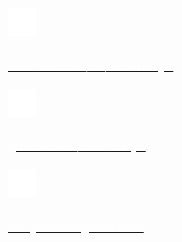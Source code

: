 \documentclass[../main.tex]{subfiles}
\begin{document}
    \hspace*{1cm}
    \begin{minipage}[t]{1cm}
        \vspace*{0.2cm}\includegraphics[width=0.75cm]{assets/linkedin.png}
    \end{minipage}
    \begin{minipage}[t]{5.5cm}
        \vspace*{0.4cm}\textcolor{white}{\underline{\href{https://www.linkedin.com/in/albatalaya}{\textcolor{white}{linkedin.com/in/albatalaya}}}}
    \end{minipage}
    \begin{minipage}[t]{1cm}
        \vspace*{0.2cm}\includegraphics[width=0.75cm]{assets/github.png}
    \end{minipage}
    \begin{minipage}[t]{4.5cm}
        \vspace*{0.4cm}\textcolor{white}{\underline{\href{https://www.github.com/albatalaya}{\textcolor{white}{github.com/albatalaya}}}}
    \end{minipage}
    \begin{minipage}[t]{1cm}
        \vspace*{0.2cm}\includegraphics[width=0.75cm]{assets/mail.png}
    \end{minipage}
    \begin{minipage}[t]{5cm}
        \vspace*{0.4cm}\textcolor{white}{\underline{\href{mailto:talayaalba@gmail.com}{\textcolor{white}{talayaalba@gmail.com}}}}
    \end{minipage}

        
    \vspace*{0.25cm}
\end{document}
